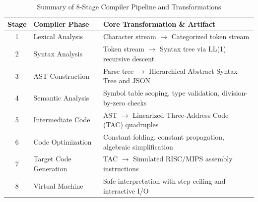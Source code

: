 \documentclass[12pt,a4paper]{report}
\begin{document}
\begin{table}[htbp]
    \centering
    \caption{Summary of 8-Stage Compiler Pipeline and Transformations}
    \label{tab:pipeline_summary}
    \vspace{0.2cm}
    \begin{tabularx}{\textwidth}{clX}
        \toprule
        \textbf{Stage} & \textbf{Compiler Phase} & \textbf{Core Transformation \& Artifact} \\
        \midrule
        1 & Lexical Analysis & Character stream $\rightarrow$ Categorized token stream \\
        2 & Syntax Analysis & Token stream $\rightarrow$ Syntax tree via LL(1) recursive descent \\
        3 & AST Construction & Parse tree $\rightarrow$ Hierarchical Abstract Syntax Tree and JSON \\
        4 & Semantic Analysis & Symbol table scoping, type validation, division-by-zero checks \\
        5 & Intermediate Code & AST $\rightarrow$ Linearized Three-Address Code (TAC) quadruples \\
        6 & Code Optimization & Constant folding, constant propagation, algebraic simplification \\
        7 & Target Code Generation & TAC $\rightarrow$ Simulated RISC/MIPS assembly instructions \\
        8 & Virtual Machine & Safe interpretation with step ceiling and interactive I/O \\
        \bottomrule
    \end{tabularx}
\end{table}
\end{document}
